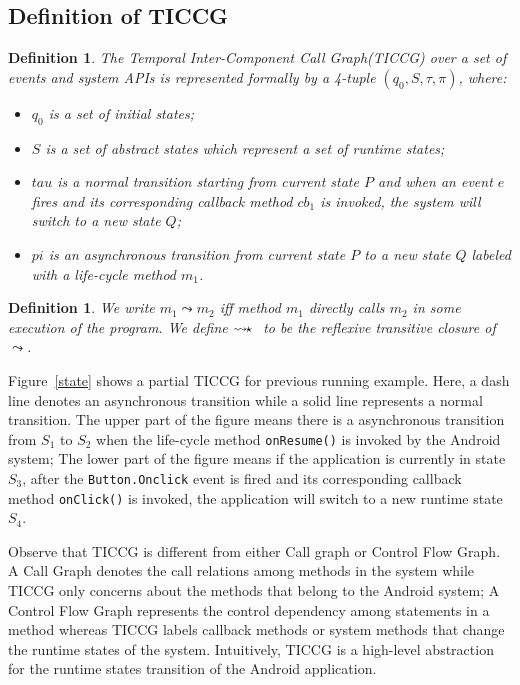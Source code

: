 \documentclass{article}
\newtheorem{definition}[theorem]{Definition}
\newcommand*{\leadstostar}{\leadsto\hspace{-.14cm}\star\ }
\begin{document}
\subsection{Definition of TICCG}
\begin{definition}
\vspace{-0.05in}
The Temporal Inter-Component Call Graph(TICCG) over a set of events and system APIs
is represented formally by a 4-tuple $(q_0,S,\tau,\pi)$, where:
\begin{itemize}
\item $q_0$ is a set of initial states;
\item $S$ is a set of abstract states which represent a set of runtime states;
\item $tau$ is a normal transition starting from current state $P$ and when an event
$e$ fires and its corresponding callback method $cb_1$ is invoked, the system will switch
to a new state $Q$;
\item $pi$ is an asynchronous transition from current state $P$ to a new state $Q$
labeled with a life-cycle method $m_1$.
\end{itemize}
\vspace{-0.05in}
\end{definition}

\begin{definition} 
\label{def:leadsto}
\vspace{-0.05in}
We write $m_1 \leadsto m_2$ iff method $m_1$ directly calls 
$m_2$ in some execution of the program. We define $\leadstostar$ to be the reflexive 
transitive closure of  $\leadsto$.
\vspace{-0.05in}
\end{definition} 


Figure~\ref{state} shows a partial TICCG for previous running example. Here, a dash line denotes
an asynchronous transition while a solid line represents a normal transition. The upper part of 
the figure means there is a asynchronous transition from $S_1$ to $S_2$ when the life-cycle method \verb+onResume()+ is invoked by the Android system; The lower part of the figure means if the application is currently in state $S_3$, after the \verb+Button.Onclick+ event is fired and its 
corresponding callback method \verb+onClick()+ is invoked, the application will switch to 
a new runtime state $S_4$.

Observe that TICCG is different from either Call graph or Control Flow Graph.
A Call Graph denotes the call relations among methods in the system while TICCG only concerns
about the methods that belong to the Android system; A Control Flow Graph represents the control
dependency among statements in a method whereas TICCG labels callback methods or system methods
that change the runtime states of the system. Intuitively, TICCG is a high-level abstraction
for the runtime states transition of the Android application.
\end{document}
